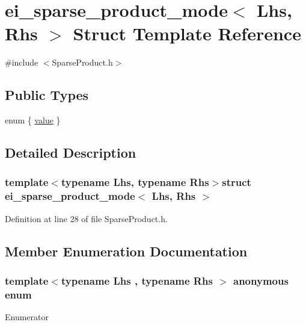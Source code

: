\hypertarget{structei__sparse__product__mode}{\section{ei\-\_\-sparse\-\_\-product\-\_\-mode$<$ Lhs, Rhs $>$ Struct Template Reference}
\label{structei__sparse__product__mode}
}


{\ttfamily \#include $<$Sparse\-Product.\-h$>$}

\subsection*{Public Types}
\begin{DoxyCompactItemize}
\item 
enum \{ \hyperlink{structei__sparse__product__mode_a39fc999e835b99e3feeb433dc49080deafdb8c21b8e53057aaf92151850750c53}{value}
 \}
\end{DoxyCompactItemize}


\subsection{Detailed Description}
\subsubsection*{template$<$typename Lhs, typename Rhs$>$struct ei\-\_\-sparse\-\_\-product\-\_\-mode$<$ Lhs, Rhs $>$}



Definition at line 28 of file Sparse\-Product.\-h.



\subsection{Member Enumeration Documentation}
\hypertarget{structei__sparse__product__mode_a39fc999e835b99e3feeb433dc49080de}{\subsubsection[{anonymous enum}]{\setlength{\rightskip}{0pt plus 5cm}template$<$typename Lhs , typename Rhs $>$ anonymous enum}}\label{structei__sparse__product__mode_a39fc999e835b99e3feeb433dc49080de}
\begin{Desc}
\item[Enumerator]\par
\begin{description}
\item[{\em 
\hypertarget{structei__sparse__product__mode_a39fc999e835b99e3feeb433dc49080deafdb8c21b8e53057aaf92151850750c53}{value}\label{structei__sparse__product__mode_a39fc999e835b99e3feeb433dc49080deafdb8c21b8e53057aaf92151850750c53}
}]\end{description}
\end{Desc}


